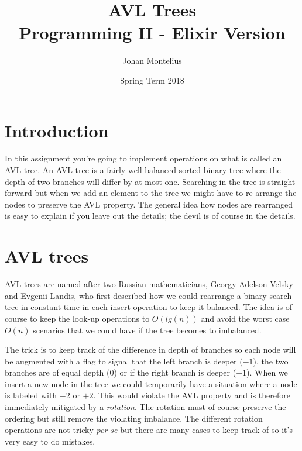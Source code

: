 \documentclass[a4paper,11pt]{article}
\begin{document}

\title{
    \textbf{AVL Trees}\\
    \large{Programming II - Elixir Version}
}
\author{Johan Montelius}
\date{Spring Term 2018}
\maketitle
{}



\section*{Introduction}

In this assignment you're going to implement operations on what is
called an AVL tree. An AVL tree is a fairly well balanced sorted
binary tree where the depth of two branches will differ by at most
one. Searching in the tree is straight forward but when we add an
element to the tree we might have to re-arrange the nodes to preserve
the AVL property. The general idea how nodes are rearranged is easy to
explain if you leave out the details; the devil is of course in the
details.



\section{AVL trees}

AVL trees are named after two Russian mathematicians, Georgy
Adelson-Velsky and Evgenii Landis, who first described how we could
rearrange a binary search tree in constant time in each insert
operation to keep it balanced. The idea is of course to keep the
look-up operations to $O(lg(n))$ and avoid the worst case $O(n)$
scenarios that we could have if the tree becomes to imbalanced.

The trick is to keep track of the difference in depth of branches so
each node will be augmented with a flag to signal that the left branch
is deeper ($-1$), the two branches are of equal depth ($0$) or if the
right branch is deeper ($+1$). When we insert a new node in the tree we
could temporarily have a situation where a node is labeled with $-2$ or
$+2$. This would violate the AVL property and is therefore immediately
mitigated by a {\em rotation}. The rotation must of course preserve
the ordering but still remove the violating imbalance. The different
rotation operations are not tricky {\em per se} but there are many
cases to keep track of so it's very easy to do mistakes. 
\end{document}
